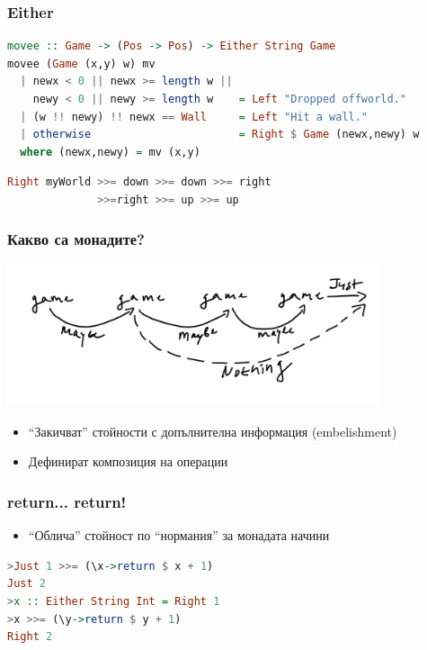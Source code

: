 \documentclass{beamer}
\begin{document}
\begin{frame}[fragile]
  \frametitle{Either}


\begin{lstlisting}[basicstyle=\tiny\ttfamily,language=Haskell]
movee :: Game -> (Pos -> Pos) -> Either String Game
movee (Game (x,y) w) mv 
  | newx < 0 || newx >= length w ||
    newy < 0 || newy >= length w    = Left "Dropped offworld."
  | (w !! newy) !! newx == Wall     = Left "Hit a wall."
  | otherwise                       = Right $ Game (newx,newy) w
  where (newx,newy) = mv (x,y)

\end{lstlisting}

\begin{lstlisting}[language=Haskell]
Right myWorld >>= down >>= down >>= right 
              >>=right >>= up >>= up
\end{lstlisting}

\end{frame}



\begin{frame}[fragile]
  \frametitle{Какво са монадите?}

  \includegraphics[width=110mm]{images/composition}

\begin{itemize}
  \item ``Закичват'' стойности с допълнителна информация (embelishment)
  \item Дефинират композиция на операции
\end{itemize}

\end{frame}

\begin{frame}[fragile]
  \frametitle{return... return!}

\begin{itemize}
  \item ``Облича'' стойност по ``нормания'' за монадата начини
\end{itemize}

\begin{lstlisting}[language=Haskell]
>Just 1 >>= (\x->return $ x + 1)
Just 2
>x :: Either String Int = Right 1
>x >>= (\y->return $ y + 1)
Right 2
\end{lstlisting}

\end{frame}
\end{document}

